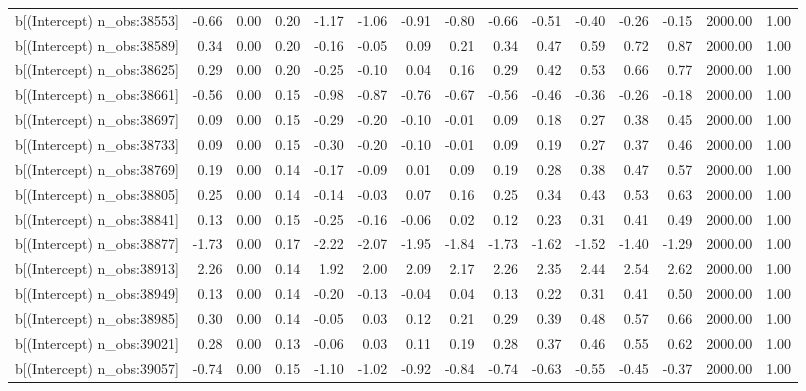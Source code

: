 \begin{table}[ht]
\begin{tabular}{rrrrrrrrrrrrrrr}
  b[(Intercept) n\_obs:38553] & -0.66 & 0.00 & 0.20 & -1.17 & -1.06 & -0.91 & -0.80 & -0.66 & -0.51 & -0.40 & -0.26 & -0.15 & 2000.00 & 1.00 \\ 
  b[(Intercept) n\_obs:38589] & 0.34 & 0.00 & 0.20 & -0.16 & -0.05 & 0.09 & 0.21 & 0.34 & 0.47 & 0.59 & 0.72 & 0.87 & 2000.00 & 1.00 \\ 
  b[(Intercept) n\_obs:38625] & 0.29 & 0.00 & 0.20 & -0.25 & -0.10 & 0.04 & 0.16 & 0.29 & 0.42 & 0.53 & 0.66 & 0.77 & 2000.00 & 1.00 \\ 
  b[(Intercept) n\_obs:38661] & -0.56 & 0.00 & 0.15 & -0.98 & -0.87 & -0.76 & -0.67 & -0.56 & -0.46 & -0.36 & -0.26 & -0.18 & 2000.00 & 1.00 \\ 
  b[(Intercept) n\_obs:38697] & 0.09 & 0.00 & 0.15 & -0.29 & -0.20 & -0.10 & -0.01 & 0.09 & 0.18 & 0.27 & 0.38 & 0.45 & 2000.00 & 1.00 \\ 
  b[(Intercept) n\_obs:38733] & 0.09 & 0.00 & 0.15 & -0.30 & -0.20 & -0.10 & -0.01 & 0.09 & 0.19 & 0.27 & 0.37 & 0.46 & 2000.00 & 1.00 \\ 
  b[(Intercept) n\_obs:38769] & 0.19 & 0.00 & 0.14 & -0.17 & -0.09 & 0.01 & 0.09 & 0.19 & 0.28 & 0.38 & 0.47 & 0.57 & 2000.00 & 1.00 \\ 
  b[(Intercept) n\_obs:38805] & 0.25 & 0.00 & 0.14 & -0.14 & -0.03 & 0.07 & 0.16 & 0.25 & 0.34 & 0.43 & 0.53 & 0.63 & 2000.00 & 1.00 \\ 
  b[(Intercept) n\_obs:38841] & 0.13 & 0.00 & 0.15 & -0.25 & -0.16 & -0.06 & 0.02 & 0.12 & 0.23 & 0.31 & 0.41 & 0.49 & 2000.00 & 1.00 \\ 
  b[(Intercept) n\_obs:38877] & -1.73 & 0.00 & 0.17 & -2.22 & -2.07 & -1.95 & -1.84 & -1.73 & -1.62 & -1.52 & -1.40 & -1.29 & 2000.00 & 1.00 \\ 
  b[(Intercept) n\_obs:38913] & 2.26 & 0.00 & 0.14 & 1.92 & 2.00 & 2.09 & 2.17 & 2.26 & 2.35 & 2.44 & 2.54 & 2.62 & 2000.00 & 1.00 \\ 
  b[(Intercept) n\_obs:38949] & 0.13 & 0.00 & 0.14 & -0.20 & -0.13 & -0.04 & 0.04 & 0.13 & 0.22 & 0.31 & 0.41 & 0.50 & 2000.00 & 1.00 \\ 
  b[(Intercept) n\_obs:38985] & 0.30 & 0.00 & 0.14 & -0.05 & 0.03 & 0.12 & 0.21 & 0.29 & 0.39 & 0.48 & 0.57 & 0.66 & 2000.00 & 1.00 \\ 
  b[(Intercept) n\_obs:39021] & 0.28 & 0.00 & 0.13 & -0.06 & 0.03 & 0.11 & 0.19 & 0.28 & 0.37 & 0.46 & 0.55 & 0.62 & 2000.00 & 1.00 \\ 
  b[(Intercept) n\_obs:39057] & -0.74 & 0.00 & 0.15 & -1.10 & -1.02 & -0.92 & -0.84 & -0.74 & -0.63 & -0.55 & -0.45 & -0.37 & 2000.00 & 1.00 \\ 

\end{tabular}
\end{table}
